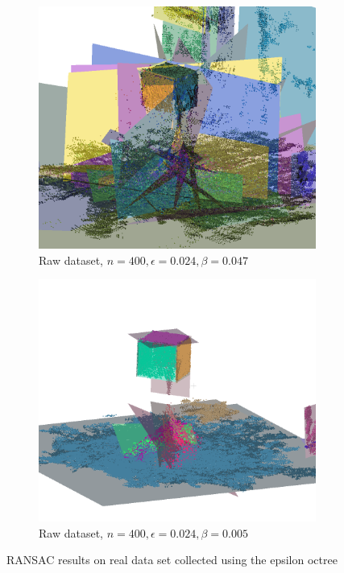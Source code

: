 \begin{figure}[htb]
    \begin{subfigure}[b]{0.5\textwidth}
        \centering
        \includegraphics[width=0.7\linewidth]{images/results_all}
        \caption{Raw dataset, $n=400, \epsilon=0.024, \beta=0.047$}
    \end{subfigure}%
    \begin{subfigure}[b]{0.5\textwidth}
        \centering
        \includegraphics[width=0.7\linewidth]{images/results-all-2}
        \caption{Raw dataset, $n=400, \epsilon=0.024, \beta=0.005$}
    \end{subfigure}%
    \caption{RANSAC results on real data set collected using the epsilon octree}
    \label{fig:real-data-ransac}
\end{figure}

